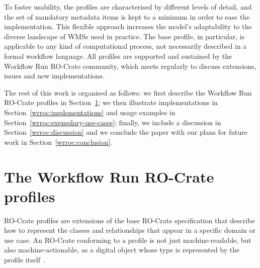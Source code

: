 To foster usability, the profiles are characterised by different levels of detail, and the set of mandatory metadata items is kept to a minimum in order to ease the implementation.
This flexible approach increases the model's adaptability to the diverse landscape of WMSs used in practice.
The base profile, in particular, is applicable to any kind of computational process, not necessarily described in a formal workflow language.
All profiles are supported and sustained by the Workflow Run RO-Crate community, which meets regularly to discuss extensions, issues and new implementations.

The rest of this work is organised as follows: we first describe the Workflow Run RO-Crate profiles in Section~\ref{wrroc:the-workflow-run-ro-crate-profiles}; we then illustrate implementations in Section~\ref{wrroc:implementations} and usage examples in Section~\ref{wrroc:exemplary-use-cases}; finally, we include a discussion in Section~\ref{wrroc:discussion} and we conclude the paper with our plans for future work in Section~\ref{wrroc:conclusion}.


\section{The Workflow Run RO-Crate profiles}\label{wrroc:the-workflow-run-ro-crate-profiles}

RO-Crate profiles are extensions of the base RO-Crate specification that describe how to represent the classes and relationships that appear in a specific domain or use case.
An RO-Crate conforming to a profile is not just machine-readable, but also machine-actionable, as a digital object whose type is represented by the profile itself~\cite{Soiland-Reyes 2022b}.

